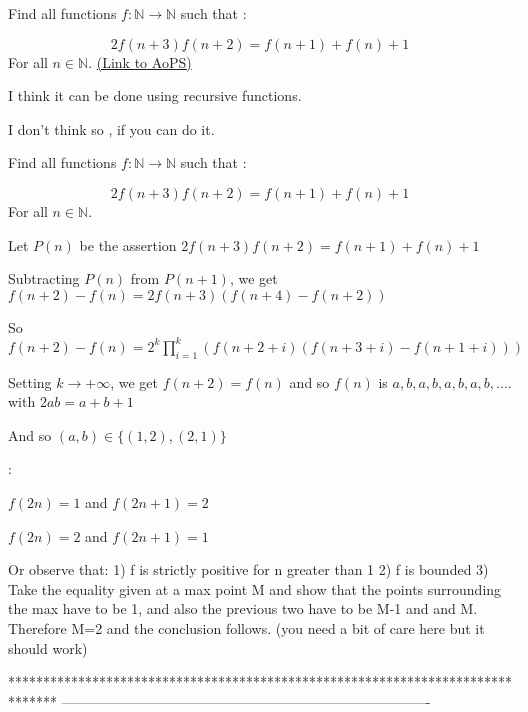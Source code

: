 \begin{problem}
	Find all functions $f: \mathbb{N}\to\mathbb{N}$ such that :

\[ 2f(n+3)f(n+2)=f(n+1)+f(n)+1 \]
For all $n \in \mathbb {N}$.
	\flushright \href{https://artofproblemsolving.com/community/c6h544722}{(Link to AoPS)}
\end{problem}



\begin{solution}
	I think it can be done using recursive functions.
\end{solution}



\begin{solution}
	I don't think so , if you can do it.
\end{solution}



\begin{solution}
	\begin{tcolorbox}Find all functions $f: \mathbb{N}\to\mathbb{N}$ such that :

\[ 2f(n+3)f(n+2)=f(n+1)+f(n)+1 \]
For all $n \in \mathbb {N}$.\end{tcolorbox}
Let $P(n)$ be the assertion $2f(n+3)f(n+2)=f(n+1)+f(n)+1$

Subtracting $P(n)$ from $P(n+1)$, we get $f(n+2)-f(n)=2f(n+3)(f(n+4)-f(n+2))$

So $f(n+2)-f(n)=2^k\prod_{i=1}^{k}\left(f(n+2+i)(f(n+3+i)-f(n+1+i))\right)$

Setting $k\to+\infty$, we get $f(n+2)=f(n)$ and so $f(n)$ is $a,b,a,b,a,b,a,b,....$ with $2ab=a+b+1$

And so $(a,b)\in\{(1,2),(2,1)\}$

 :

$f(2n)=1$ and $f(2n+1)=2$

$f(2n)=2$ and $f(2n+1)=1$
\end{solution}



\begin{solution}
	Or observe that:
1) f is strictly positive for n greater than 1
2) f is bounded
3) Take the equality given at a max point M and show that the points surrounding the max have to be 1, and also the previous two have to be M-1 and and M. Therefore M=2 and the conclusion follows. (you need a bit of care here but it should work)
\end{solution}
*******************************************************************************
-------------------------------------------------------------------------------

